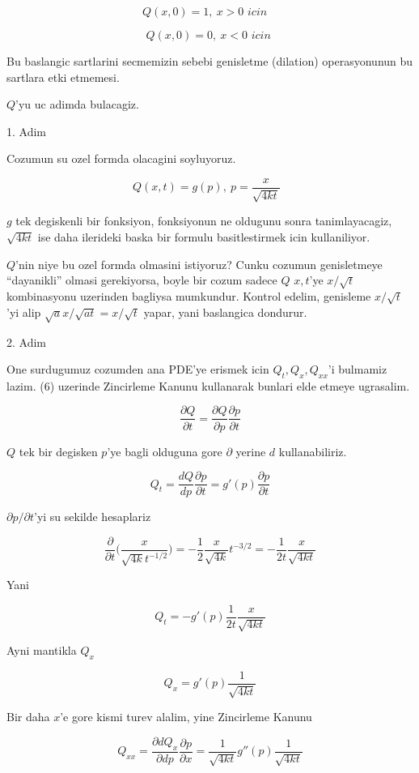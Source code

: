 \documentclass[12pt,fleqn]{article}\usepackage{../common}
\begin{document}
\[ Q(x,0) = 1, \ x>0 \textit{ icin } \ \ \ \label{7}\]

\[ Q(x,0)=0, \ x<0 \textit{ icin }  \]

Bu baslangic sartlarini secmemizin sebebi genisletme (dilation)
operasyonunun bu sartlara etki etmemesi. 

$Q$'yu uc adimda bulacagiz. 

1. Adim

Cozumun su ozel formda olacagini soyluyoruz. 

\[ Q(x,t) = g(p), \ p = \frac{x}{\sqrt{4kt}} \ \ \ \label{6} \]


$g$ tek degiskenli bir fonksiyon, fonksiyonun ne oldugunu sonra
tanimlayacagiz, $\sqrt{4kt}$ ise daha ilerideki baska bir formulu
basitlestirmek icin kullaniliyor. 

$Q$'nin niye bu ozel formda olmasini istiyoruz? Cunku cozumun genisletmeye
``dayanikli'' olmasi gerekiyorsa, boyle bir cozum sadece $Q$ $x,t$'ye
$x/\sqrt{t}$ kombinasyonu uzerinden bagliysa mumkundur. Kontrol edelim,
genisleme $x/\sqrt{t}$'yi alip $\sqrt{a}x/\sqrt{at} = x/\sqrt{t}$ yapar,
yani baslangica dondurur. 

2. Adim

One surdugumuz cozumden ana PDE'ye erismek icin $Q_t,Q_{x},Q_{xx}$'i
bulmamiz lazim. (6) uzerinde Zincirleme Kanunu kullanarak bunlari elde
etmeye ugrasalim. 

\[ \frac{\partial Q}{\partial t} = 
\frac{\partial Q}{\partial p}\frac{\partial p}{\partial t}
\]

$Q$ tek bir degisken $p$'ye bagli olduguna gore $\partial$ yerine $d$
kullanabiliriz. 

\[ Q_t = 
\frac{dQ}{dp}\frac{\partial p}{\partial t}  = 
g'(p)\frac{\partial p}{\partial t} 
\]

$\partial p/\partial t$'yi su sekilde hesaplariz

\[ 
\frac{\partial }{\partial t}
\bigg( 
\frac{x}{\sqrt{4k} t ^{-1/2}}
\bigg) = 
-\frac{1}{2} \frac{x}{\sqrt{4k}} t ^{-3/2} = 
-\frac{1}{2t} \frac{x}{\sqrt{4kt}}
 \]

Yani 

\[ Q_t = 
- g'(p)\frac{1}{2t} \frac{x}{\sqrt{4kt}}
\]

Ayni mantikla $Q_x$

\[ Q_x = g'(p)\frac{1}{\sqrt{4kt}} \]

Bir daha $x$'e gore kismi turev alalim, yine Zincirleme Kanunu 

\[ Q_{xx} = \frac{\partial dQ_x}{\partial dp}
\frac{\partial p}{\partial x} = 
\frac{1}{\sqrt{4kt}}g''(p)\frac{1}{\sqrt{4kt}} 
 \]
\end{document}
